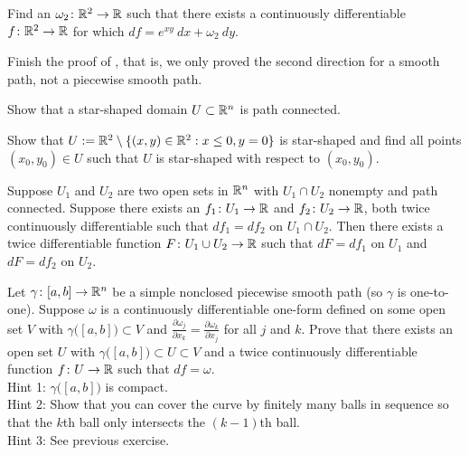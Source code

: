 \begin{exercise}
Find an $\omega_2 \colon {\mathbb{R}}^2 \to {\mathbb{R}}$ such that
there exists a continuously differentiable $f \colon {\mathbb{R}}^2 \to {\mathbb{R}}$
for which
$df = e^{xy} ~dx + \omega_2 ~dy$.
\end{exercise}

\begin{exercise}
Finish the proof of , that is, we only proved the
second direction for a smooth path, not a piecewise smooth path.
\end{exercise}

\begin{exercise}
Show that a star-shaped domain $U \subset {\mathbb{R}}^n$ is path connected.
\end{exercise}

\begin{exercise}
Show that $U := {\mathbb{R}}^2 \setminus \{ (x,y) \in {\mathbb{R}}^2 : x \leq 0, y=0 \}$ is
star-shaped and find all points $(x_0,y_0) \in U$ such that
$U$ is star-shaped with respect to $(x_0,y_0)$.
\end{exercise}

\begin{exercise}
Suppose $U_1$ and $U_2$ are two open sets in ${\mathbb{R}}^n$ with $U_1 \cap U_2$
nonempty and path connected.
Suppose there exists an $f_1 \colon U_1 \to {\mathbb{R}}$ and
$f_2 \colon U_2 \to {\mathbb{R}}$, both twice continuously differentiable
such that $d f_1 = d f_2$ on $U_1 \cap U_2$.
Then there exists a twice differentiable function $F \colon U_1 \cup U_2 \to
{\mathbb{R}}$ such that $dF = df_1$ on $U_1$ and $dF = df_2$ on $U_2$.
\end{exercise}

\begin{exercise}[Hard]
Let $\gamma \colon [a,b] \to {\mathbb{R}}^n$ be a simple nonclosed piecewise smooth
path (so $\gamma$
is one-to-one).  Suppose $\omega$ is a continuously differentiable
one-form defined on some open
set $V$ with $\gamma\bigl([a,b]\bigr) \subset V$ and
$\frac{\partial \omega_j}{\partial x_k} = \frac{\partial \omega_k}{\partial
x_j}$
for all $j$ and $k$.  Prove that there exists an open set $U$
with $\gamma\bigl([a,b]\bigr) \subset U \subset V$ and
a twice continuously differentiable function $f \colon U \to {\mathbb{R}}$
such that $df = \omega$.
\\
Hint 1: $\gamma\bigl([a,b]\bigr)$ is compact.\\
Hint 2: Show that you can cover the curve by finitely many balls in sequence
so that the $k$th ball only intersects the $(k-1)$th ball.\\
Hint 3: See previous exercise.
\end{exercise}

